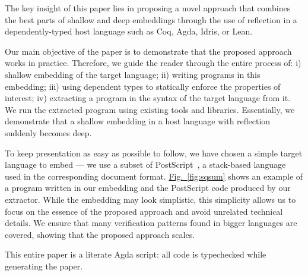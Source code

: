 \documentclass[sigplan,screen,anonymous,review]{acmart}
\newcommand{\myref}[2]{\hyperref[#2]{#1~\ref*{#2}}}
\newcommand{\figref}[1]{\myref{Fig.}{fig:#1}}%
\begin{document}
The key insight of this paper lies in proposing a novel approach that
combines the best parts of shallow and deep embeddings through the use
of reflection in a
dependently-typed host language such as Coq, Agda, Idris, or Lean.

Our main objective of the paper is to demonstrate that the
proposed approach works in practice.  Therefore, we guide the reader
through the entire process of: i) shallow embedding of the target
language;  ii) writing programs in this embedding; iii) using
dependent types to statically enforce the properties of interest;
iv) extracting a program in the syntax of the target language
from it.  We run the extracted program using existing
tools and libraries. Essentially, we demonstrate that a
shallow embedding in a host language with reflection
suddenly becomes deep.



To keep presentation as easy as possible to follow, we have
chosen a simple target language to embed --- we use a subset
of PostScript~\citep{postscript1999language}, a stack-based
language used in the corresponding document format.
%
\figref{sqsum} shows an example of a program
written in our embedding and the PostScript code produced by
our extractor.
%
While the embedding may look simplistic, this simplicity
allows us to focus on the essence of the proposed approach and avoid unrelated
technical details.  We ensure that many verification patterns found in bigger
languages are covered, showing that the proposed approach scales.

This entire paper is a literate Agda script: all code is typechecked
while generating the paper.
\end{document}
